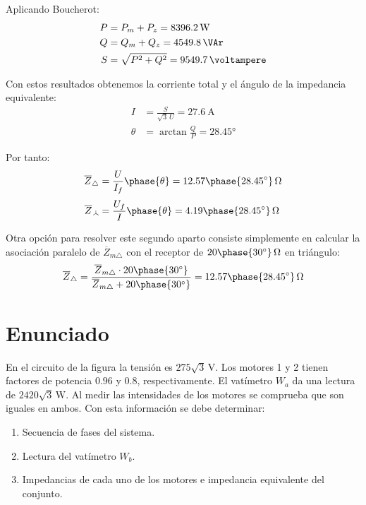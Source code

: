 \begin{enumerate}
  Aplicando Boucherot:
  \begin{align*}
    P &= P_m + P_z = \qty{8396.2}{\watt}\\
    Q &= Q_m + Q_z = \qty{4549.8}{\VAr}\\
    S & = \sqrt{P^2 + Q^2} = \qty{9549.7}{\voltampere}
  \end{align*}

  Con estos resultados obtenemos la corriente total y el ángulo de la impedancia equivalente:
  \begin{align*}
    I &= \frac{S}{\sqrt{3} \,U} = \qty{27.6}{\ampere}\\
    \theta &= \arctan \frac{Q}{P} = \ang{28.45}
  \end{align*}

  Por tanto:
  \begin{align*}
    \overline{Z}_{\triangle} &= \frac{U}{I_{f}}\phase{\theta} = 12.57\phase{\ang{28.45}}\,\unit{\ohm}\\[3pt]
    \overline{Z}_{\wye} &= \frac{U_f}{I}\phase{\theta} = 4.19\phase{\ang{28.45}}\,\unit{\ohm}
  \end{align*}

  Otra opción para resolver este segundo aparto consiste simplemente en calcular la asociación paralelo de $\overline{Z}_{m\triangle}$ con el receptor de $20\phase{\ang{30}}\,\si{\ohm}$ en triángulo:
  \[
    \overline{Z}_{\triangle} = \frac{\overline{Z}_{m\triangle} \cdot 20\phase{\ang{30}}}{\overline{Z}_{m\triangle} + 20\phase{\ang{30}}} = 12.57\phase{\ang{28.45}}\,\unit{\ohm}
  \]
  
\end{enumerate}

\section{Enunciado}

En el circuito de la figura la tensión es $275\sqrt{3}\,\unit{\volt}$. Los motores 1 y 2 tienen factores de potencia $0.96$ y $0.8$, respectivamente. El vatímetro $W_a$ da una lectura de $2420\sqrt{3}\,\unit{\watt}$. Al medir las intensidades de los motores se comprueba que son iguales en ambos. Con esta información se debe determinar:

\begin{enumerate}
\item Secuencia de fases del sistema.
\item Lectura del vatímetro $W_b$.
\item Impedancias de cada uno de los motores e impedancia equivalente del conjunto.
\end{enumerate}

